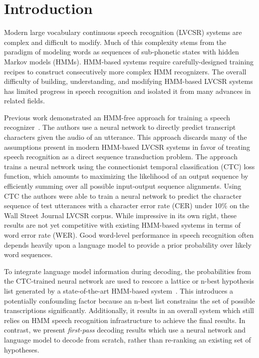 \section{Introduction}
\label{sec:first_pass:introduction}

Modern large vocabulary continuous speech recognition (LVCSR) systems are
complex and difficult to modify. Much of this complexity stems from the
paradigm of modeling words as sequences of sub-phonetic states with hidden
Markov models (HMMs). HMM-based systems require carefully-designed training
recipes to construct consecutively more complex HMM recognizers. The overall
difficulty of building, understanding, and modifying HMM-based LVCSR systems
has limited progress in speech recognition and isolated it from many advances
in related fields. 

Previous work demonstrated an HMM-free approach for training a speech
recognizer~\cite{graves2014}. The authors use a neural network to directly
predict transcript characters given the audio of an utterance. This approach
discards many of the assumptions present in modern HMM-based LVCSR systems in
favor of treating speech recognition as a direct sequence transduction problem.
The approach trains a neural network using the connectionist temporal
classification (CTC) loss function, which amounts to maximizing the likelihood
of an output sequence by efficiently summing over all possible input-output
sequence alignments.  Using CTC the authors were able to train a neural network
to predict the character sequence of test utterances with a character error
rate (CER) under 10\% on the Wall Street Journal LVCSR corpus. While impressive
in its own right, these results are not yet competitive with existing HMM-based
systems in terms of word error rate (WER). Good word-level performance in
speech recognition often depends heavily upon a language model to provide a
prior probability over likely word sequences. 

To integrate language model information during decoding, the probabilities from
the CTC-trained neural network are used to rescore a lattice or n-best
hypothesis list generated by a state-of-the-art HMM-based
system~\cite{graves2014}. This introduces a potentially confounding factor
because an n-best list constrains the set of possible transcriptions
significantly.  Additionally, it results in an overall system which still
relies on HMM speech recognition infrastructure to achieve the final results.
In contrast, we present \emph{first-pass} decoding results which use a neural
network and language model to decode from scratch, rather than re-ranking an
existing set of hypotheses.

